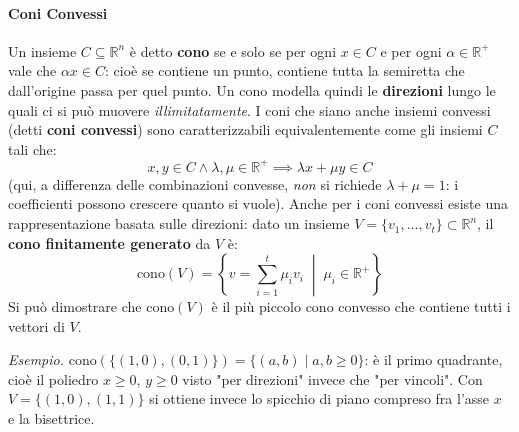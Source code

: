 \documentclass[12pt]{extarticle} %
\begin{document}
\paragraph{Coni Convessi}
Un insieme $C \subseteq \mathbb{R}^n$ è detto \textbf{cono} se e solo se per ogni $x \in C$ e per ogni $\alpha \in \mathbb{R}^+$ vale che $\alpha x \in C$: cioè se contiene un punto, contiene tutta la semiretta che dall'origine passa per quel punto. Un cono modella quindi le \textbf{direzioni} lungo le quali ci si può muovere \emph{illimitatamente}.
I coni che siano anche insiemi convessi (detti \textbf{coni convessi}) sono caratterizzabili equivalentemente come gli insiemi $C$ tali che:
\[ x, y \in C \wedge \lambda, \mu \in \mathbb{R}^+ \implies \lambda x + \mu y \in C \]
(qui, a differenza delle combinazioni convesse, \emph{non} si richiede $\lambda+\mu=1$: i coefficienti possono crescere quanto si vuole).
Anche per i coni convessi esiste una rappresentazione basata sulle direzioni: dato un insieme $V = \{v_1, \dots, v_t\} \subset \mathbb{R}^n$, il \textbf{cono finitamente generato} da $V$ è:
\[ \text{cono}(V) = \left\{ v = \sum_{i=1}^t \mu_i v_i \;\middle|\; \mu_i \in \mathbb{R}^+ \right\} \]
Si può dimostrare che $\text{cono}(V)$ è il più piccolo cono convesso che contiene tutti i vettori di $V$.

\noindent\textit{Esempio.} $\text{cono}(\{(1,0),(0,1)\}) = \{(a,b) \mid a,b\ge0\}$: è il primo quadrante, cioè il poliedro $x\ge0,\,y\ge0$ visto "per direzioni" invece che "per vincoli". Con $V=\{(1,0),(1,1)\}$ si ottiene invece lo spicchio di piano compreso fra l'asse $x$ e la bisettrice.
\end{document}
